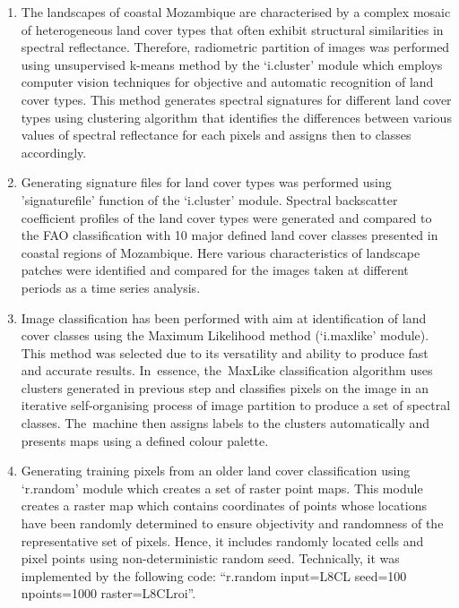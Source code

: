 \documentclass[coasts,article,accept,pdftex,oneauthor]{Definitions/mdpi}
\begin{document}
\begin{enumerate}
{''. Here, each band was selected for each of the RGB triplets (red, green and blue) which enabled to visualise the images in various combinations (natural and false colour composites)}. 
  \item {The landscapes of coastal Mozambique are characterised by a complex mosaic of heterogeneous land cover types that often exhibit structural similarities in spectral reflectance. Therefore, }radiometric {partition of images was performed} using unsupervised k-means method {by the }`i.cluster' module {which employs computer vision techniques for objective and automatic recognition of land cover types. This method generates spectral signatures for different land cover types using clustering algorithm that identifies the differences between various values of spectral reflectance for each pixels and assigns then to classes accordingly.}
    \item Generating signature files for land cover types {was performed }using 'signaturefile' function of the `i.cluster' module. Spectral backscatter coefficient profiles of the land cover types were generated and compared to {the }FAO classification with 10 major defined land cover classes { presented in coastal regions of Mozambique}. Here various characteristics of landscape patches were identified and compared for {the }images taken at different {periods as a time series analysis}.
  \item Image classification {has been performed with aim at identification of land cover classes }using the Maximum Likelihood method (`i.maxlike' module). {This method was selected due to its versatility and ability to produce fast and accurate results. In~essence, the~MaxLike classification algorithm uses clusters generated in previous step and classifies pixels on the image in an iterative self-organising process of image partition to produce a set of spectral classes. The~machine then assigns labels to the clusters automatically and presents maps using a defined colour palette}.
  \item Generating training pixels from an older land cover classification using `r.random' module which creates a set of raster point maps. {This module creates a raster map which contains coordinates of points whose locations have been randomly determined to ensure objectivity and randomness of the representative set of pixels. Hence, it } includes randomly located cells and pixel points using non-deterministic random seed. {Technically, it was implemented by the following code: ``r.random input=L8CL seed=100 npoints=1000 raster=L8CLroi''.}

\end{enumerate}
\end{document}
